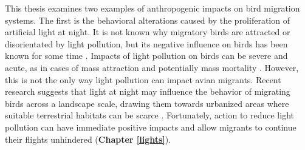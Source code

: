 \documentclass[a4paper, nobind]{templates/ociamthesis}
\begin{document}
This thesis examines two examples of anthropogenic impacts on bird migration systems. The first is the behavioral alterations caused by the proliferation of artificial light at night. It is not known why migratory birds are attracted or disorientated by light pollution, but its negative influence on birds has been known for some time \autocite{allenDestructionBirdsLighthouses1880}. Impacts of light pollution on birds can be severe and acute, as in cases of mass attraction and potentially mass mortality \autocite[e.g.~\textbf{Chapter \ref{lights}};][]{richEcologicalConsequencesArtificial2013}. However, this is not the only way light pollution can impact avian migrants. Recent research suggests that light at night may influence the behavior of migrating birds across a landscape scale, drawing them towards urbanized areas where suitable terrestrial habitats can be scarce \autocite{mclarenArtificialLightNight2018}. Fortunately, action to reduce light pollution can have immediate positive impacts and allow migrants to continue their flights unhindered (\textbf{Chapter \ref{lights}}).
\end{document}
